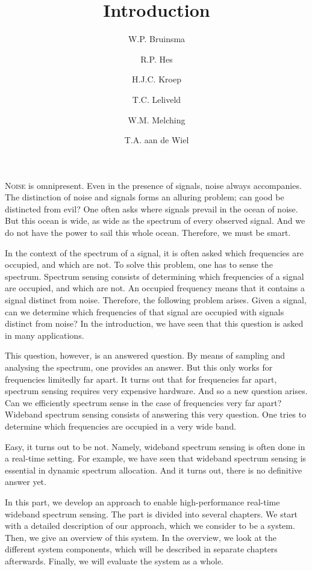 \documentclass[a4paper, openany, oneside]{memoir}
\title{Introduction}
\author{W.P. Bruinsma \and R.P. Hes \and H.J.C. Kroep \and T.C. Leliveld \and W.M. Melching \and T.A. aan de Wiel}
\begin{document}
\lettrine[lines=3]{N}{oise} is omnipresent. Even in the presence of signals, noise always accompanies. The distinction of noise and signals forms an alluring problem; can good be distincted from evil? One often asks where signals prevail in the ocean of noise. But this ocean is wide, as wide as the spectrum of every observed signal. And we do not have the power to sail this whole ocean. Therefore, we must be smart.

In the context of the spectrum of a signal, it is often asked which frequencies are occupied, and which are not. To solve this problem, one has to sense the spectrum. Spectrum sensing consists of determining which frequencies of a signal are occupied, and which are not. An occupied frequency means that it contains a signal distinct from noise. Therefore, the following problem arises. Given a signal, can we determine which frequencies of that signal are occupied with signals distinct from noise? In the introduction, we have seen that this question is asked in many applications.

This question, however, is an answered question. By means of sampling and analysing the spectrum, one provides an answer. But this only works for frequencies limitedly far apart. It turns out that for frequencies far apart, spectrum sensing requires very expensive hardware. And so a new question arises. Can we efficiently spectrum sense in the case of frequencies very far apart? Wideband spectrum sensing consists of answering this very question. One tries to determine which frequencies are occupied in a very wide band.

Easy, it turns out to be not. Namely, wideband spectrum sensing is often done in a real-time setting. For example, we have seen that wideband spectrum sensing is essential in dynamic spectrum allocation. And it turns out, there is no definitive answer yet.

In this part, we develop an approach to enable high-performance real-time wideband spectrum sensing. The part is divided into several chapters. We start with a detailed description of our approach, which we consider to be a system. Then, we give an overview of this system. In the overview, we look at the different system components, which will be described in separate chapters afterwards. Finally, we will evaluate the system as a whole.
\end{document}
